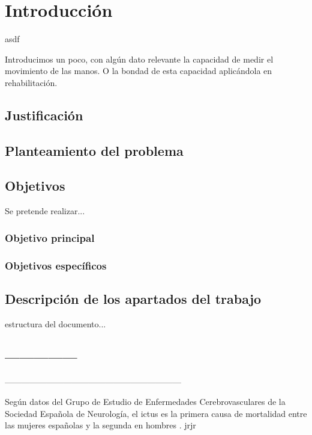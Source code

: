 \chapter{Introducción}

asdf

Introducimos un poco, con algún dato relevante la capacidad de medir el movimiento de las manos. 
O la bondad de esta capacidad aplicándola en rehabilitación.


\section{Justificación}
\label{sec:justificacion1}

\section{Planteamiento del problema}
\label{sec:planteamiento1}

\section{Objetivos}
\label{sec:objetivos1}
Se pretende realizar...

\subsection{Objetivo principal}
\label{sec:objPrinc1}

\subsection{Objetivos específicos}
\label{sec:objEspec1}


\section{Descripción de los apartados del trabajo}
\label{sec:disposicion1}

estructura del documento...

\section{---------------}

---------------------------------------------------------------

Según datos del Grupo de Estudio de Enfermedades Cerebrovasculares de la Sociedad Española de Neurología, el ictus es la primera causa de mortalidad entre las mujeres españolas y la segunda en hombres \cite{ictuss}. jrjr

